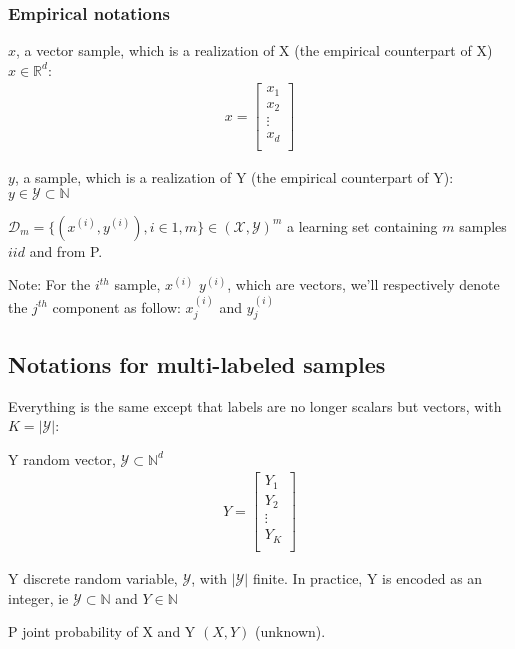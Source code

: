 \subsubsection*{Empirical notations}

\begin{outline}
\1 $x$, a vector sample, which is a realization of X (the empirical counterpart of X) $x \in \mathbb{R}^d$:
\begin{align}
	x = \left[
	\begin{array}{cccc}
		x_{1} \\
		x_{2} \\
		\vdots\\
		x_{d} \\
	\end{array}\right]
\end{align}

\1 $y$, a sample, which is a realization of Y (the empirical counterpart of Y): $y \in \mathcal{Y} \subset \mathbb{N}$

\1 $ \mathcal{D}_m = \{(x^{(i)}, y^{(i)}), i \in 1,m\} \in (\mathcal{X},\mathcal{Y})^m$ a learning set containing $m$ samples $iid$ and from P.\\
\end{outline}

Note:
For the $i^{th}$ sample, $x^{(i)}$ $y^{(i)}$, which are vectors, we'll respectively denote the $j^{th}$ component as follow: $x_j^{(i)}$ and $y_j^{(i)}$


\subsection*{Notations for multi-labeled samples}

Everything is the same except that labels are no longer scalars but vectors, with $K = |\mathcal{Y}|$:

\begin{outline}
\1 Y random vector, $\mathcal{Y} \subset \mathbb{N}^d$
\begin{align}
	Y = \left[
	\begin{array}{cccc}
		Y_{1} \\
		Y_{2} \\
		\vdots\\
		Y_{K} \\
	\end{array}\right]
\end{align}

\1 Y discrete random variable, $\mathcal{Y} $, with $|\mathcal{Y}|$ finite. In practice, Y is encoded as an integer, ie $\mathcal{Y} \subset \mathbb{N} $ and $Y \in \mathbb{N}$

\1 P joint probability of X and Y $(X,Y)$ (unknown).
\end{outline}






